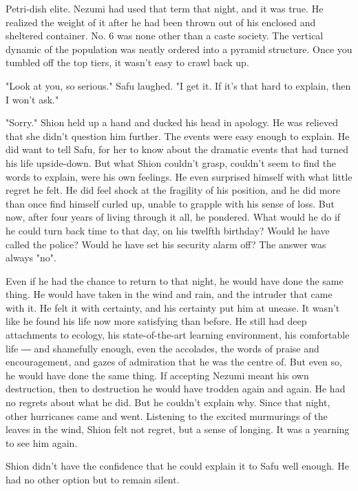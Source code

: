 Petri-dish elite. Nezumi had used that term that night, and it was true.
He realized the weight of it after he had been thrown out of his
enclosed and sheltered container. No. 6 was none other than a caste
society. The vertical dynamic of the population was neatly ordered into
a pyramid structure. Once you tumbled off the top tiers, it wasn't easy
to crawl back up.

\myspace

"Look at you, so serious." Safu laughed. "I get it. If it's that hard to
explain, then I won't ask."

"Sorry." Shion held up a hand and ducked his head in apology. He was
relieved that she didn't question him further. The events were easy
enough to explain. He did want to tell Safu, for her to know about the
dramatic events that had turned his life upside-down. But what Shion
couldn't grasp, couldn't seem to find the words to explain, were his own
feelings. He even surprised himself with what little regret he felt. He
did feel shock at the fragility of his position, and he did more than
once find himself curled up, unable to grapple with his sense of loss.
But now, after four years of living through it all, he pondered. What
would he do if he could turn back time to that day, on his twelfth
birthday? Would he have called the police? Would he have set his
security alarm off? The answer was always "no".~

Even if he had the chance to return to that night, he would have done
the same thing. He would have taken in the wind and rain, and the
intruder that came with it. He felt it with certainty, and his certainty
put him at unease. It wasn't like he found his life now more satisfying
than before. He still had deep attachments to ecology, his
state-of-the-art learning environment, his comfortable life ― and
shamefully enough, even the accolades, the words of praise and
encouragement, and gazes of admiration that he was the centre of. But
even so, he would have done the same thing. If accepting Nezumi meant
his own destruction, then to destruction he would have trodden again and
again. He had no regrets about what he did. But he couldn't explain why.
Since that night, other hurricanes came and went. Listening to the
excited murmurings of the leaves in the wind, Shion felt not regret, but
a sense of longing. It was a yearning to see him again.

Shion didn't have the confidence that he could explain it to Safu well
enough. He had no other option but to remain silent.

